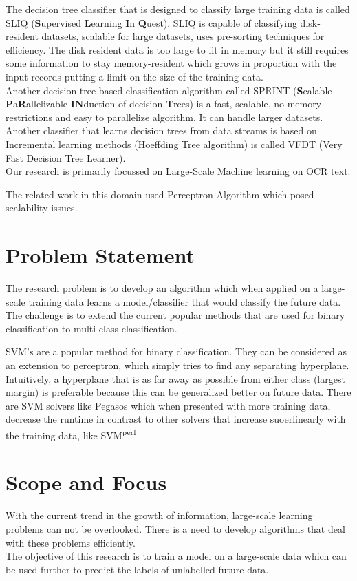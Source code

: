 \documentclass{article}
\begin{document}
The decision tree classifier that is designed to classify large training data is called SLIQ (\textbf{S}upervised \textbf{L}earning \textbf{I}n \textbf{Q}uest). SLIQ is capable of classifying disk-resident datasets, scalable for large datasets, uses pre-sorting techniques for efficiency. The disk resident data is too large to fit in memory but it still requires some information to stay memory-resident which grows in proportion with the input records putting a limit on the size of the training data.\\ Another decision tree based classification algorithm called SPRINT (\textbf{S}calable \textbf{P}a\textbf{R}allelizable \textbf{IN}duction of decision \textbf{T}rees) is a fast, scalable, no memory restrictions and easy to parallelize algorithm. It can handle larger datasets.
Another classifier that learns decision trees from data streams is based on Incremental learning methods (Hoeffding Tree algorithm) is called VFDT (Very Fast Decision Tree Learner).\\
Our research is primarily focussed on Large-Scale Machine learning on OCR text.


The related work in this domain used Perceptron Algorithm which posed scalability issues. 



\section{Problem Statement}
The research problem is to develop an algorithm which when applied on a large-scale training data learns a model/classifier that would classify the future data. The challenge is to extend the current popular methods that are used for binary classification to multi-class classification.

SVM's are a popular method for binary classification. They can be considered as an extension to perceptron, which simply tries to find any separating hyperplane. Intuitively, a hyperplane that is as far away as possible from either class (largest margin) is preferable because this can be generalized better on future data.
There are SVM solvers like Pegasos which when presented with more training data, decrease the runtime in contrast to other solvers that increase suoerlinearly with the training data, like SVM\textsuperscript{perf}

\section{Scope and Focus}
With the current trend in the growth of information, large-scale learning problems can not be overlooked. There is a need to develop algorithms that deal with these problems efficiently.\\
The objective of this research is to train a model on a large-scale data which can be used further to predict the labels of unlabelled future data.
\end{document}
